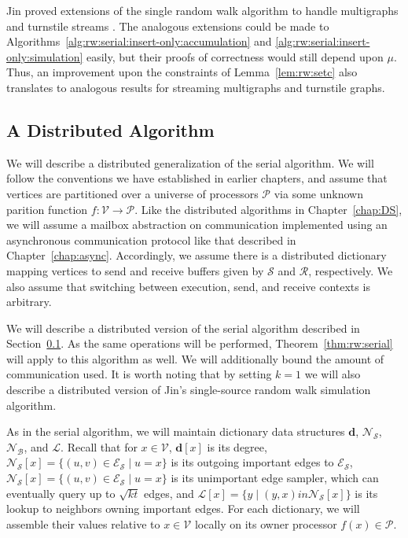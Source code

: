 \documentclass{report}
\begin{document}
Jin proved extensions of the single random walk algorithm to handle multigraphs and turnstile streams \cite{jin2018simulating}.
The analogous extensions could be made to Algorithms~\ref{alg:rw:serial:insert-only:accumulation} and \ref{alg:rw:serial:insert-only:simulation} easily, but their proofs of correctness would still depend upon $\mu$.
Thus, an improvement upon the constraints of Lemma~\ref{lem:rw:setc} also translates to analogous results for streaming multigraphs and turnstile graphs. 


\subsection{A Distributed Algorithm}
 \label{walks:sec:walks:distributed}

We will describe a distributed generalization of the serial algorithm.
We will follow the conventions we have established in earlier chapters, and assume that vertices are partitioned over a universe of processors $\mathcal{P}$ via some unknown parition function $f : \mathcal{V} \rightarrow \mathcal{P}$.
Like the distributed algorithms in Chapter~\ref{chap:DS}, we will assume a mailbox abstraction on communication implemented using an asynchronous communication protocol like that described in Chapter~\ref{chap:async}.
Accordingly, we assume there is a distributed dictionary mapping vertices to send and receive buffers given by $\mathcal{S}$ and $\mathcal{R}$, respectively.
We also assume that switching between execution, send, and receive contexts is arbitrary.

We will describe a distributed version of the serial algorithm described in Section~\ref{walks:sec:walks:distributed}.
As the same operations will be performed, Theorem~\ref{thm:rw:serial} will apply to this algorithm as well.
We will additionally bound the amount of communication used.
It is worth noting that by setting $k =1$ we will also describe a distributed version of Jin's single-source random walk simulation algorithm.

As in the serial algorithm, we will maintain dictionary data structures $\mathbf{d}$, $\mathcal{N}_\mathcal{S}$, $\mathcal{N}_\mathcal{B}$, and $\mathcal{L}$.
Recall that for $x \in \mathcal{V}$, $\mathbf{d}[x]$ is its degree, $\mathcal{N}_\mathcal{S}[x] = \{(u, v) \in \mathcal{E}_\mathcal{S} \mid u = x \}$ is its outgoing important edges to $\mathcal{E}_\mathcal{S}$, $\mathcal{N}_\mathcal{S}[x] = \{(u, v) \in \mathcal{E}_\mathcal{S} \mid u = x \}$ is its unimportant edge sampler, which can eventually query up to $\sqrt{kt}$ edges, and $\mathcal{L}[x] = \{ y \mid (y, x) in \mathcal{N}_\mathcal{S}[x] \}$ is its lookup to neighbors owning important edges.
For each dictionary, we will assemble their values relative to $x \in \mathcal{V}$ locally on its owner processor $f(x) \in \mathcal{P}$.
\end{document}
